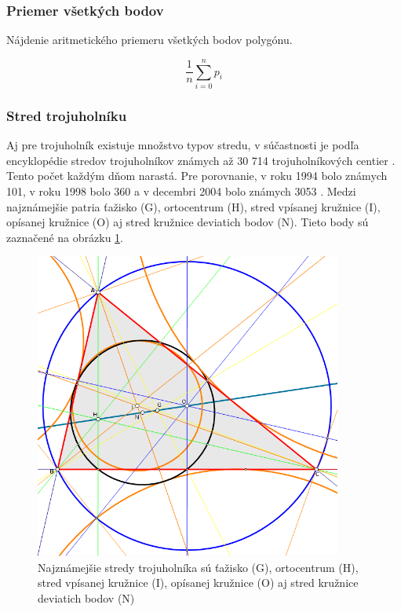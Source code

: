 \subsubsection{Priemer všetkých bodov}
Nájdenie aritmetického priemeru všetkých bodov polygónu.

\begin{equation}
    \frac{1}{n} \sum_{i=0}^{n} p_i   
    \label{eq:aritPriemer}
\end{equation}


\subsubsection{Stred trojuholníku}
Aj pre trojuholník existuje množstvo typov stredu, v súčastnosti je podľa encyklopédie stredov trojuholníkov známych až 30 714 trojuholníkových centier \cite{kimberling_2019}. Tento počet každým dňom narastá. Pre porovnanie, v roku 1994 bolo známych 101, v roku 1998 bolo 360 a v decembri 2004 bolo známych 3053 \cite{Kimberling_Center_2004}. Medzi najznámejšie patria ťažisko (G), ortocentrum (H), stred vpísanej kružnice (I), opísanej kružnice (O) aj stred kružnice deviatich bodov (N). Tieto body sú zaznačené na obrázku \ref{fig:TriangleCenters}.


\begin{figure}[H]
	\centering
	\includegraphics[width=0.9\textwidth]{obrazky-figures/Trigonometric_centres.png}
	\caption{Najznámejšie stredy trojuholníka sú ťažisko (G), ortocentrum (H), stred vpísanej kružnice (I), opísanej kružnice (O) aj stred kružnice deviatich bodov (N) \cite{triangle_center_2012}}
	\label{fig:TriangleCenters}
\end{figure}


